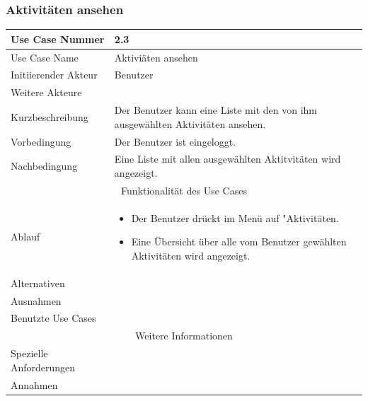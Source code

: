 \documentclass[10pt,a4paper]{article}
\begin{document}
\subsubsection{Aktivit\"aten ansehen}
	\begin{tabular}{|l|p{.5\linewidth}|}
	\hline Use Case Nummer & 2.3 \\ 
	\hline Use Case Name & Aktivi\"aten ansehen \\ 
	\hline Initiierender Akteur & Benutzer \\
	\hline Weitere Akteure &  \\
	\hline Kurzbeschreibung & Der Benutzer kann eine Liste mit den von ihm ausgew\"ahlten Aktivit\"aten ansehen. \\
	\hline Vorbedingung & Der Benutzer ist eingeloggt. \\
	\hline Nachbedingung & Eine Liste mit allen ausgewählten Aktitvitäten wird angezeigt. \\
	\hline \multicolumn{2}{|c|}{Funktionalität des Use Cases}\\
	\hline Ablauf & \begin{itemize}
		\item Der Benutzer drückt im Menü auf "Aktivit\"aten.
		\item Eine Übersicht über alle vom Benutzer gewählten Aktivit\"aten wird angezeigt.
	\end{itemize} \\
	\hline Alternativen &  \\
	\hline Ausnahmen &  \\
	\hline Benutzte Use Cases &  \\
	\hline \multicolumn{2}{|c|}{Weitere Informationen} \\
	\hline Spezielle Anforderungen &  \\
	\hline Annahmen &  \\
	\hline
	\end{tabular}
\end{document}
